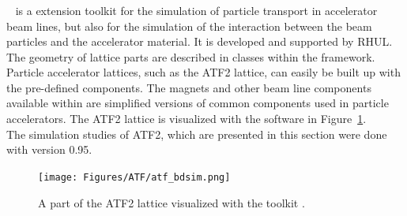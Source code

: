 \subsubsection{\bdsim}
\label{BDSIM}
\bdsim~\cite{BDSIM} is a \geant extension toolkit for the simulation of particle transport in accelerator beam lines, but also for the simulation of the interaction between the beam particles and the accelerator material. 
It is developed and supported by RHUL.
The geometry of lattice parts are described in classes within the \bdsim framework. 
Particle accelerator lattices, such as the ATF2 lattice, can easily be built up with the pre-defined components. 
The magnets and other beam line components available within \bdsim are simplified versions of common components used in particle accelerators. 
The ATF2 lattice is visualized with the \bdsim software in Figure~\ref{fig:ATF2_BDSIM}.
\\The simulation studies of ATF2, which are presented in this section were done with \bdsim version 0.95.
\begin{figure}[!h]
\centering
\texttt{[image: Figures/ATF/atf\_bdsim.png]}
\caption[ATF2 lattice in \bdsim]{A part of the ATF2 lattice visualized with the \geant toolkit \bdsim.}
\label{fig:ATF2_BDSIM}
\end{figure}

